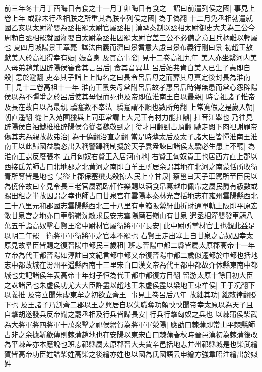 前三年冬十月丁酉晦日有食之十一月丁卯晦日有食之　詔曰前遣列侯之國|{
	事見上卷上年}
或辭未行丞相朕之所重其為朕率列侯之國|{
	為于偽翻}
十二月免丞相勃遣就國乙亥以太尉灌嬰為丞相罷太尉官屬丞相|{
	漢承秦制以丞相太尉御史大夫為三公今周勃自丞相罷就國灌嬰自太尉為丞相因罷太尉官盖三公不必備之意且兵柄難以輕屬也}
夏四月城陽景王章薨|{
	諡法由義而濟曰景耆意大慮曰景布義行剛曰景}
初趙王敖獻美人於高祖得幸有娠|{
	娠音身}
及貫高事發|{
	見十二卷高祖九年}
美人亦坐繫河内美人母弟趙兼因辟陽侯審食其言呂后|{
	食其音異基}
呂后妬弗肯白美人已生子恚即自殺|{
	恚於避翻}
吏奉其子詣上上悔名之曰長令呂后母之而葬其母真定後封長為淮南王|{
	見十二卷高祖十一年}
淮南王蚤失母常附呂后故孝惠呂后時得無患而常心怨辟陽侯以為不彊爭之於呂后使其母恨而死也及帝即位淮南王自以最親|{
	時高祖諸子惟帝及長在故自以為最親}
驕蹇數不奉法|{
	驕蹇謂不順也數所角翻}
上常寛假之是歲入朝|{
	朝直遥翻}
從上入苑囿獵與上同車常謂上大兄王有材力能扛鼎|{
	扛音江舉也}
乃往見辟陽侯自袖鐵椎椎辟陽侯令從者魏敬剄之|{
	從才用翻剄古頂翻}
馳走闕下肉袒謝罪帝傷其志為親故赦弗治|{
	為于偽翻治直之翻}
當是時薄太后及太子諸大臣皆憚淮南王淮南王以此歸國益驕恣出入稱警蹕稱制擬於天子袁盎諫曰諸侯太驕必生患上不聽|{
	為淮南王謀反廢張本}
五月匈奴右賢王入居河南地|{
	右賢王匈奴貴王也居西方直上郡以西接氐羌師古曰北地郡之北黄河之南即白羊王所居余謂其地在北河之南蒙恬所收衛青所奪皆是地也}
侵盜上郡保塞蠻夷殺掠人民上幸甘泉|{
	蔡邕曰天子車駕所至臣民以為僥倖故曰幸見令長三老官屬親臨軒作樂賜以酒食帛葛越巾佩帶之屬民爵有級數或賜田租之半故因謂之幸也師古曰甘泉宫在雲陽本秦林光宫括地志在雍州雲陽縣西北三十八里元和郡國志雲陽縣西北三十八里有車箱阪縈紆曲折財通單軌上阪即平原宏敞甘泉宫之地亦曰車盤嶺沈敏求長安志雲陽磨石嶺山有甘泉}
遣丞相灌嬰發車騎八萬五千詣高奴擊右賢王發中尉材官屬衛將軍軍長安|{
	此中尉所掌材官士也觀此益足以明二年罷　衛將軍軍衛將軍之官本不罷也}
右賢王走出塞上自甘泉之高奴因幸太原見故羣臣皆賜之復晉陽中都民三歲租|{
	班志晉陽中都二縣皆屬太原郡高帝十一年立帝為代王都晉陽如淳註曰文紀言都中都又帝復晉陽中都二歲似遷都於中都也括地志中都故城在汾州平遥縣西南十三里宋白曰漢文帝為代王都中都故介休縣東南中都城也史記諸侯年表高帝十年封子恒為代王都中都復方目翻}
留游太原十餘日初大臣之誅諸呂也朱虚侯功尤大大臣許盡以趙地王朱虚侯盡以梁地王東牟侯|{
	王于况翻下以義推}
及帝立聞朱虚東牟之初欲立齊王|{
	事見上卷呂后八年}
故絀其功|{
	絀敕律翻貶下也}
及王諸子乃割齊二郡以王之興居自以失職奪功頗怏怏聞帝幸太原以為天子且自擊胡遂發兵反帝聞之罷丞相及行兵皆歸長安|{
	行兵行擊匈奴之兵也}
以棘蒲侯柴武為大將軍將四將軍十萬衆擊之祁侯繒賀為將軍軍滎陽|{
	應劭曰棘蒲即常山平棘縣師古非之余據靳歙傳則棘蒲趙地也在安陽以東宋白曰棘蒲春秋時晉邑漢初為棘蒲後改為平棘盖亦本應說也班志祁縣屬太原郡晉大夫賈辛邑括地志并州祁縣城是也柴武繒賀皆高帝功臣姓譜柴姓高柴之後繒亦姓也以國為氏國語云申繒方強韋昭注繒出於姒姓}
